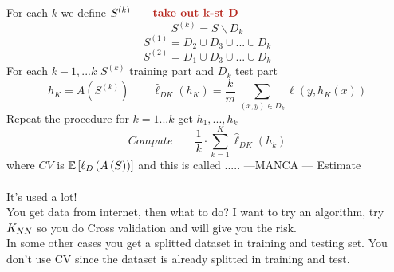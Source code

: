 \documentclass[../main.tex]{subfiles}
\begin{document}
For each $k$ we define $S^{(k)}
 \qquad \bred{take out k-st D}$
$$
S^{(k)} = S\backslash D_k
$$
$$
S^{(1)} = D_2 \cup D_3 \cup ...\cup D_k
$$
$$
S^{(2)} = D_1 \cup D_3 \cup ... \cup D_k
$$
For each $k-1, ... k$  \qquad $S^{(k)}$ training part and $D_k$ test part
$$
h_K = A \left( S^{(k)} \right) \qquad \hat{\ell}_{DK} \left(h_K\right) = \frac{k}{m} \, \sum_{ (x,y) \in D_k}{} \ell \left( y, h_K\left( x \right) \right ) 
$$
Repeat the procedure for $k = 1 ... k$ \quad get $h_1, ... , h_k$
\\
$$
Compute \qquad \frac{1}{k} \cdot \sum_{k=1}^{K} \hat{\ell}_{DK} \left(h_k\right)
$$
where $CV$ is $\mathbb{E}\left[ \ell_D \left(A\left(S \right) \right) \right]$ and this is called ..... ---MANCA ---  Estimate
\\\\
It’s used a lot!\\
You get data from internet, then what to do? I want to try an algorithm, try $K_{NN}$ so you do Cross validation and will give you the risk.\\
In some other cases you get a splitted dataset in training and testing set.
You don’t use CV since the dataset is already splitted in training and test.
\end{document}
